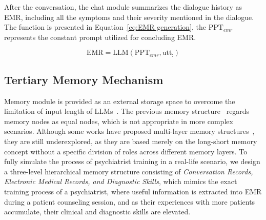 After the conversation, the chat module summarizes the dialogue history as EMR, including all the symptoms and their severity mentioned in the dialogue. The function is presented in Equation~\ref{eq:EMR generation}, the $\mathrm{PPT}_{emr}$ represents the constant prompt utilized for concluding EMR.

\begin{equation}
    \mathrm{EMR} = \mathrm{LLM}(\mathrm{PPT}_{emr}, \mathrm{utt}_{:})
    \label{eq:EMR generation}
\end{equation}

\subsection{Tertiary Memory Mechanism}

Memory module is provided as an external storage space to overcome the limitation of input length of LLMs~\cite{zhang2024surveymemorymechanismlarge}. The previous memory structure~\cite{Park2023GenerativeAgents} regards memory nodes as equal nodes, which is not appropriate in more complex scenarios. Although some works have proposed multi-layer memory structures~\cite{qian2024chatdevcommunicativeagentssoftware,li2023tradinggptmultiagentlayeredmemory,sumers2023cognitive, maharana2024evaluatinglongtermconversationalmemory}, they are still underexplored, as they are based merely on the long-short memory concept without a specific division of roles across different memory layers. To fully simulate the process of psychiatrist training in a real-life scenario, we design a three-level hierarchical memory structure consisting of \textit{Conversation Records, Electronic Medical Records, and Diagnostic Skills}, 
which mimics the exact training process of a psychiatrist, where useful information is extracted into EMR during a patient counseling session, and as their experiences with more patients accumulate, their clinical and diagnostic skills are elevated.  %

